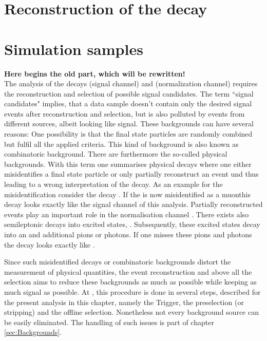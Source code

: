 \section{Reconstruction of the decay \LbToLcmunu}

\section{Simulation samples}


\textbf{Here begins the old part, which will be rewritten!} \\

The analysis of the decays \LbToDpmunuX (signal channel)  and \LbToLcmunu (normalization channel) requires the reconstruction and selection of possible signal candidates.
The term ``signal candidates" implies, that a data sample doesn't contain only the desired signal events after reconstruction and selection, but is also polluted by events from different sources, albeit looking like signal.
These backgrounds can have several reasons: 
One possibility is that the final state particles are randomly combined but fulfil all the applied criteria. 
This kind of background is also known as combinatoric background.
There are furthermore the so-called physical backgrounds.
With this term one summarises physical decays where one either misidentifies a final state particle or only partially reconstruct an event und thus leading to a wrong interpretation of the decay.
As an example for the misidentification consider the decay \decay{\Lb}{\Dz\proton\pim}. If the \pim is now misidentified as a muonthis decay looks exactly like the signal channel of this analysis.
Partially reconstructed events play an important role in the normalisation channel \LbToLcmunu.
There exists also semileptonic \Lb decays into excited \Lcstar states, \decay{\Lb}{\Lcstar\mun\neumb}.
Subsequently, these excited \Lcstar states decay into an \Lc and additional pions or photons.
If one misses these pions and photons the decay looks exactly like \LbToLcmunu.

Since such misidentified decays or combinatoric backgrounds distort the measurement of physical quantities, the event reconstruction and above all the selection aims to reduce these backgrounds as much as possible while keeping as much signal as possible.
At \lhcb, this procedure is done in several steps, described for the present analysis in this chapter, namely the Trigger, the preselection (or stripping) and the offline selection. 
Nonetheless not every background source can be easily eliminated. 
The handling of such issues is part of chapter \ref{sec:Backgrounds}.

